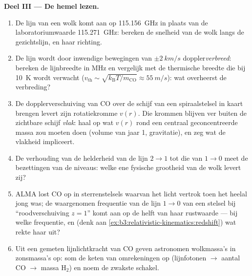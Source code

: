 \begin{problem}
\medskip\noindent\textbf{Deel III --- De hemel lezen.}
\begin{enumerate}[resume]
  \item De lijn van een wolk komt aan op \qty{115.156}{GHz} in plaats van
        de laboratoriumwaarde \qty{115.271}{GHz}: bereken de snelheid van
        de wolk langs de gezichtslijn, en haar richting.
  \item De lijn wordt door inwendige bewegingen van $\pm\qty{2}{km/s}$
        doppler\emph{verbreed}: bereken de lijnbreedte in MHz en
        vergelijk met de thermische breedte die bij \qty{10}{K} wordt
        verwacht ($v_{\text{th}} \sim \sqrt{k_{\text{B}}T/m_{\text{CO}}}
        \approx \qty{55}{m/s}$): wat
        overheerst de verbreding?
  \item De dopplerverschuiving van CO over de schijf van een
        spiraalstelsel in kaart brengen levert zijn rotatiekromme
        $v(r)$. Die krommen blijven ver buiten de zichtbare schijf
        \emph{vlak}: haal op wat $v(r)$ rond een centraal
        geconcentreerde massa zou moeten doen (volume van jaar 1,
        gravitatie), en zeg wat de vlakheid impliceert.
  \item De verhouding van de helderheid van de lijn $2\to1$ tot die van
        $1\to0$ meet de bezettingen van de niveaus: welke ene fysische
        grootheid van de wolk levert zij?
  \item ALMA lost CO op in sterrenstelsels waarvan het licht vertrok toen
        het heelal jong was; de waargenomen frequentie van de lijn
        $1 \to 0$ van een stelsel bij ``roodverschuiving $z = 1$'' komt
        aan op de helft van haar rustwaarde --- bij welke frequentie, en
        (denk aan \cref{ex:b3:relativistic-kinematics:redshift}) wat rekte
        haar uit?
  \item Uit een gemeten lijnlichtkracht van CO geven astronomen
        wolkmassa's in zonsmassa's op: som de keten van omrekeningen op
        (lijnfotonen $\to$ aantal CO $\to$ massa H$_2$) en noem de zwakste
        schakel.
\end{enumerate}


\end{problem}
